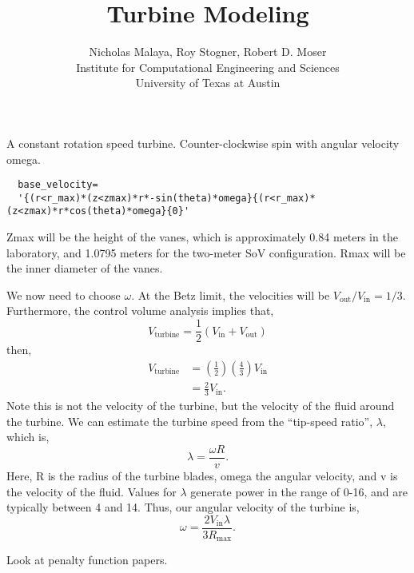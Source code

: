 \documentclass{article}
\title{\bf{Turbine Modeling}}
\author{Nicholas Malaya, Roy Stogner, Robert D. Moser \\ Institute for Computational Engineering and Sciences \\ University of Texas at Austin} \date{}
\begin{document}
\maketitle

\newpage

A constant rotation speed turbine. Counter-clockwise spin with angular velocity omega. 

\begin{verbatim}
  base_velocity=
  '{(r<r_max)*(z<zmax)*r*-sin(theta)*omega}{(r<r_max)*(z<zmax)*r*cos(theta)*omega}{0}'
\end{verbatim}

Zmax will be the height of the vanes, which is approximately 0.84 meters in the laboratory, 
and 1.0795 meters for the two-meter SoV configuration. Rmax will be the inner diameter of the vanes. 

We now need to choose $\omega$. At the Betz limit, the velocities will be
$V_{\text{out}}/V_{\text{in}} = 1/3$. Furthermore, the control volume
analysis implies that,
\begin{equation}
 V_{\text{turbine}} = \frac{1}{2}\left(V_{\text{in}} + V_{\text{out}} \right)
\end{equation}
then,
\begin{align}
 V_{\text{turbine}} &= \left(\frac{1}{2}\right) \left(\frac{4}{3}\right) V_{\text{in}} \\
 &= \frac{2}{3} V_{\text{in}}.
\end{align}
Note this is not the velocity of the turbine, but the velocity of the
fluid around the turbine. We can estimate the turbine speed from the
``tip-speed ratio'', $\lambda$, which is,
\begin{equation}
 \lambda = \frac{\omega R}{v}.
\end{equation}
Here, R is the radius of the turbine blades, omega the angular velocity,
and v is the velocity of the fluid. Values for $\lambda$ generate power
in the range of 0-16, and are typically between 4 and 14. Thus, our
angular velocity of the turbine is, 
\begin{equation}
 \omega = \frac{ 2 V_{\text{in}}\lambda}{3 R_{\text{max}}}.
\end{equation}

Look at penalty function papers. 
\end{document}
